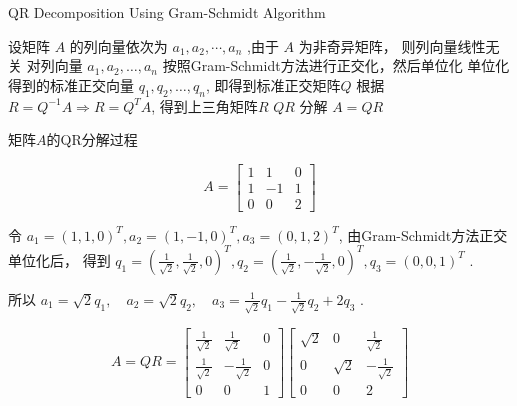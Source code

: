 \begin{algorithm}[htbp]
    \caption{QR Decomposition Using Gram-Schmidt Algorithm}
    
    设矩阵 $ A $ 的列向量依次为 $ a_{1}, a_{2}, \cdots, a_{n} $ ,由于 $ A $ 为非奇异矩阵， 则列向量线性无关\;
    对列向量 $ a_{1}, a_{2}, \ldots, a_{n} $ 按照Gram-Schmidt方法进行正交化，然后单位化\;
    单位化得到的标准正交向量 $ q_{1}, q_{2}, \ldots, q_{n} $, 即得到标准正交矩阵$Q$\;
    根据 $ R=Q^{-1} A \Rightarrow R=Q^{T} A $, 得到上三角矩阵$R$\;
    $ Q R $ 分解 $ A=Q R $\;
\end{algorithm}

\begin{example}
    矩阵$A$的QR分解过程

    \begin{equation} A=\left[\begin{array}{ccc}1 & 1 & 0 \\ 1 & -1 & 1 \\ 0 & 0 & 2\end{array}\right] \end{equation}

    令 $ a_{1}=(1,1,0)^{T}, a_{2}=(1,-1,0)^{T}, a_{3}=(0,1,2)^{T} $, 由Gram-Schmidt方法正交单位化后， 得到 $ q_{1}=\left(\frac{1}{\sqrt{2}}, \frac{1}{\sqrt{2}}, 0\right)^{T}, q_{2}=\left(\frac{1}{\sqrt{2}},-\frac{1}{\sqrt{2}}, 0\right)^{T}, q_{3}=(0,0,1)^{T} $ .

    所以 $ a_{1}=\sqrt{2} q_{1}, \quad a_{2}=\sqrt{2} q_{2}, \quad a_{3}=\frac{1}{\sqrt{2}} q_{1}-\frac{1}{\sqrt{2}} q_{2}+2 q_{3} $ .

    \begin{equation} A=Q R=\left[\begin{array}{ccc}\frac{1}{\sqrt{2}} & \frac{1}{\sqrt{2}} & 0 \\ \frac{1}{\sqrt{2}} & -\frac{1}{\sqrt{2}} & 0 \\ 0 & 0 & 1\end{array}\right]\left[\begin{array}{ccc}\sqrt{2} & 0 & \frac{1}{\sqrt{2}} \\ 0 & \sqrt{2} & -\frac{1}{\sqrt{2}} \\ 0 & 0 & 2\end{array}\right] \end{equation}

\end{example}

